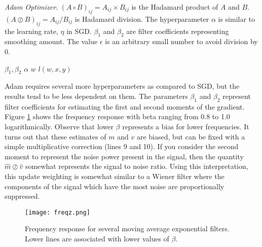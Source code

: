\begin{algorithm}
\begin{algorithmic}[1]
\begin{spacing}{1.0}
    \caption{\textit{Adam Optimizer}.  $(A\circ B)_{ij} = A_{ij}\times B_{ij}$ is the Hadamard product of $A$ and $B$.  $(A \oslash B)_{ij} = A_{ij}/B_{ij}$ is Hadamard division.  The hyperparameter $\alpha$ is similar to the learning rate, $\eta$ in SGD.  $\beta_1$ and $\beta_2$ are filter coefficients representing smoothing amount.  The value $\epsilon$ is an arbitrary small number to avoid division by $0$.}
    \Require $\beta_1,\beta_2$
    \Require $\alpha$
    \Require $w$
    \Require $l(w,x,y)$
    \EndWhile
\label{alg:adam}
\end{spacing}
\end{algorithmic}
\end{algorithm}

Adam requires several more hyperparameters as compared to SGD, but the results tend to be less dependent on them.  The parameters $\beta_1$ and $\beta_2$ represent filter coefficients for estimating the first and second moments of the gradient.  Figure \ref{fig:freqz} shows the frequency response with beta ranging from 0.8 to 1.0 logarithmically. Observe that lower $\beta$ represents a bias for lower frequencies.  It turns out that these estimates of $m$ and $v$ are biased, but can be fixed with a simple multiplicative correction (lines 9 and 10).  If you consider the second moment to represent the noise power present in the signal, then the quantity $\hat{m}\oslash \hat{v}$ somewhat represents the signal to noise ratio.  Using this interpretation, this update weighting is somewhat similar to a Wiener filter where the components of the signal which have the most noise are proportionally suppressed.

\begin{figure}
    \centering
    \texttt{[image: freqz.png]}
    \caption{Frequency response for several moving average exponential filters.  Lower lines are associated with lower values of $\beta$.}
    \label{fig:freqz}
\end{figure}

